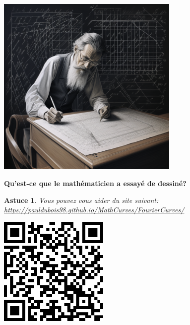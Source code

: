 \documentclass[a4paper, top=10mm]{article}
\newtheorem*{hint}{Astuce}
\begin{document}
	\begin{flushright}
		\vspace{-240pt}
		\includegraphics[width=250pt]{05mathematician_drawing.png}
	\end{flushright}

	{\Large \textbf{Qu'est-ce que le mathématicien a essayé de dessiné?}}
	\vspace{10pt}
	
	\begin{hint}
		Vous pouvez vous aider du site suivant:\\
		\url{https://pauldubois98.github.io/MathCurves/FourierCurves/}
	\end{hint}

	\begin{center}
		\vspace{5pt}
		\includegraphics[height=150pt]{05QRcode.png}
	\end{center}
	
\end{document}
